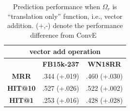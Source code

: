 \begin{table}[h]
\centering
\caption{Prediction performance when $\Omega_r$ is ``translation only'' function, i.e., vector addition. (+,-) denote the performance difference from ConvE~\cite{dettmers2018convolutional}}
\label{table10}
\begin{tabular}{c|c|c}
\hline
\multicolumn{3}{c}{\textbf{vector add operation}}\\
\hline
 & \textbf{FB15k-237} & \textbf{WN18RR}\\
 \hline
 \textbf{MRR} & .344 (+.019) & .460 (+.030) \\
 \textbf{HIT@10} & .527 (+.026) & .522 (+.002) \\
 \textbf{HIT@1} & .253 (+.016) & .428 (+.028)\\
\hline
\end{tabular}
\end{table}